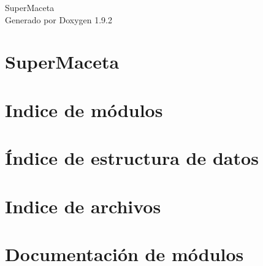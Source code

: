\documentclass[twoside]{book}
\newcommand{\+}{\discretionary{\mbox{\scriptsize$\hookleftarrow$}}{}{}}
\newcommand{\clearemptydoublepage}{%
    \newpage{\pagestyle{empty}\cleardoublepage}%
  }
\begin{document}
  \raggedbottom
    \hypersetup{pageanchor=false,
                bookmarksnumbered=true,
                pdfencoding=unicode
               }
  \begin{titlepage}
  \vspace*{7cm}
  \begin{center}%
  {\Large Super\+Maceta}\\
  \vspace*{1cm}
  {\large Generado por Doxygen 1.9.2}\\
  \end{center}
  \end{titlepage}
  \clearemptydoublepage
  \tableofcontents
  \clearemptydoublepage
  \hypersetup{pageanchor=true}
\chapter{Super\+Maceta}
\label{index}\hypertarget{index}{}
\chapter{Indice de módulos}

\chapter{Índice de estructura de datos}

\chapter{Indice de archivos}

\chapter{Documentación de módulos}





























\end{document}

